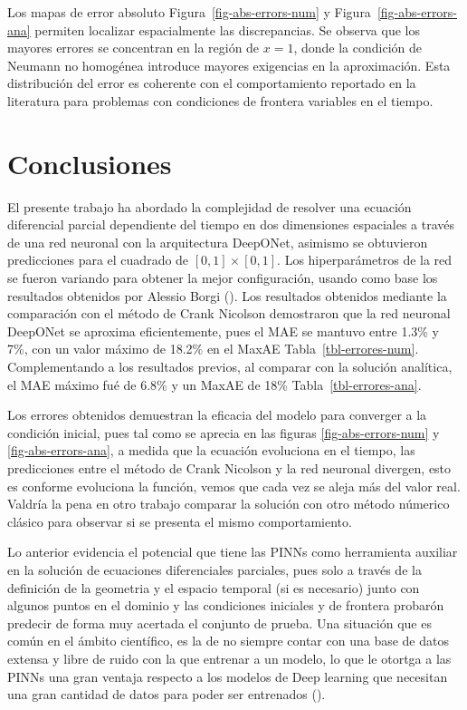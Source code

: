 \documentclass[
  spanish,
  us-letterpaper,
]{scrreprt}
\theoremstyle{definition}
\theoremstyle{plain}
\theoremstyle{remark}
\begin{document}
Los mapas de error absoluto Figura~\ref{fig-abs-errors-num} y
Figura~\ref{fig-abs-errors-ana} permiten localizar espacialmente las
discrepancias. Se observa que los mayores errores se concentran en la
región de \(x=1\), donde la condición de Neumann no homogénea introduce
mayores exigencias en la aproximación. Esta distribución del error es
coherente con el comportamiento reportado en la literatura para
problemas con condiciones de frontera variables en el tiempo.


\chapter{Conclusiones}\label{conclusiones}

El presente trabajo ha abordado la complejidad de resolver una ecuación
diferencial parcial dependiente del tiempo en dos dimensiones espaciales
a través de una red neuronal con la arquitectura DeepONet, asimismo se
obtuvieron predicciones para el cuadrado de \([0,1]\times[0,1]\). Los
hiperparámetros de la red se fueron variando para obtener la mejor
configuración, usando como base los resultados obtenidos por Alessio
Borgi (). Los resultados obtenidos
mediante la comparación con el método de Crank Nicolson demostraron que
la red neuronal DeepONet se aproxima eficientemente, pues el MAE se
mantuvo entre 1.3\% y 7\%, con un valor máximo de 18.2\% en el MaxAE
Tabla~\ref{tbl-errores-num}. Complementando a los resultados previos, al
comparar con la solución analítica, el MAE máximo fué de 6.8\% y un
MaxAE de 18\% Tabla~\ref{tbl-errores-ana}.

Los errores obtenidos demuestran la eficacia del modelo para converger a
la condición inicial, pues tal como se aprecia en las figuras
\ref{fig-abs-errors-num} y \ref{fig-abs-errors-ana}, a medida que la
ecuación evoluciona en el tiempo, las predicciones entre el método de
Crank Nicolson y la red neuronal divergen, esto es conforme evoluciona
la función, vemos que cada vez se aleja más del valor real. Valdría la
pena en otro trabajo comparar la solución con otro método númerico
clásico para observar si se presenta el mismo comportamiento.

Lo anterior evidencia el potencial que tiene las PINNs como herramienta
auxiliar en la solución de ecuaciones diferenciales parciales, pues solo
a través de la definición de la geometria y el espacio temporal (si es
necesario) junto con algunos puntos en el dominio y las condiciones
iniciales y de frontera probarón predecir de forma muy acertada el
conjunto de prueba. Una situación que es común en el ámbito científico,
es la de no siempre contar con una base de datos extensa y libre de
ruido con la que entrenar a un modelo, lo que le otortga a las PINNs una
gran ventaja respecto a los modelos de Deep learning que necesitan una
gran cantidad de datos para poder ser entrenados
().
\end{document}
